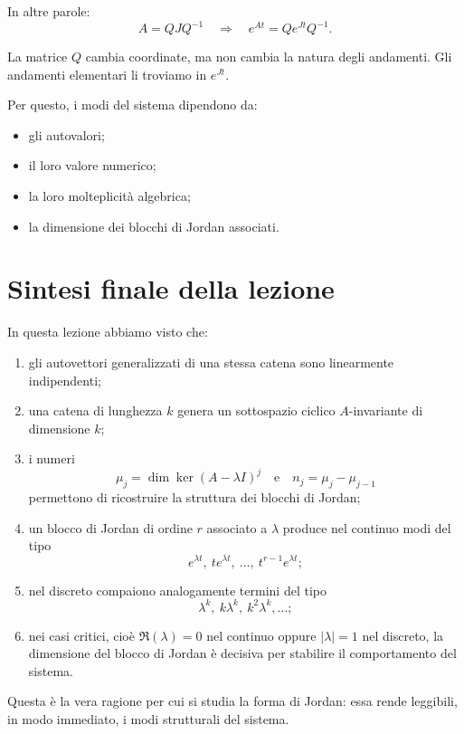 In altre parole:
\[
A = QJQ^{-1}
\quad \Longrightarrow \quad
e^{At} = Qe^{Jt}Q^{-1}.
\]

La matrice $Q$ cambia coordinate, ma non cambia la natura degli andamenti.  
Gli andamenti elementari li troviamo in $e^{Jt}$.

Per questo, i modi del sistema dipendono da:
\begin{itemize}
    \item gli autovalori;
    \item il loro valore numerico;
    \item la loro molteplicità algebrica;
    \item la dimensione dei blocchi di Jordan associati.
\end{itemize}

\section{Sintesi finale della lezione}

In questa lezione abbiamo visto che:

\begin{enumerate}
    \item gli autovettori generalizzati di una stessa catena sono linearmente indipendenti;
    \item una catena di lunghezza $k$ genera un sottospazio ciclico $A$-invariante di dimensione $k$;
    \item i numeri
    \[
    \mu_j=\dim\ker(A-\lambda I)^j
    \quad\text{e}\quad
    n_j=\mu_j-\mu_{j-1}
    \]
    permettono di ricostruire la struttura dei blocchi di Jordan;
    \item un blocco di Jordan di ordine $r$ associato a $\lambda$ produce nel continuo modi del tipo
    \[
    e^{\lambda t},\ te^{\lambda t},\ \dots,\ t^{r-1}e^{\lambda t};
    \]
    \item nel discreto compaiono analogamente termini del tipo
    \[
    \lambda^k,\ k\lambda^k,\ k^2\lambda^k,\dots;
    \]
    \item nei casi critici, cioè $\Re(\lambda)=0$ nel continuo oppure $|\lambda|=1$ nel discreto, la dimensione del blocco di Jordan è decisiva per stabilire il comportamento del sistema.
\end{enumerate}

Questa è la vera ragione per cui si studia la forma di Jordan: essa rende leggibili, in modo immediato, i modi strutturali del sistema.